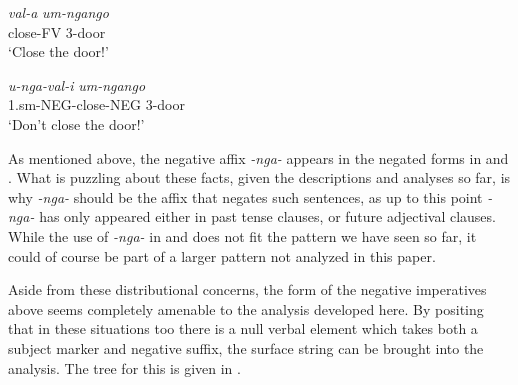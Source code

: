 \documentclass[output=paper]{langsci/langscibook}
\newcommand{\nga}[0]{\textit{-nga- }}
\begin{document}
\begin{exe}
\ex\label{ex:burkholder:28} \begin{xlist}
\ex\label{ex:burkholder:28a} \gll \textit{val-a} \textit{um-ngango}\\
        close-FV 3-door\\
    \glt `Close the door!'


\ex\label{ex:burkholder:28b} \gll \textit{u-nga-val-i} \textit{um-ngango}\\
        1.{\sc sm}-NEG-close-NEG 3-door\\
    \glt `Don't close the door!'
\end{xlist}
\end{exe}

As mentioned above, the negative affix \nga appears in the negated forms in  and . What is puzzling about these facts, given the descriptions and analyses so far, is why \nga should be the affix that negates such sentences, as up to this point \nga has only appeared either in past tense clauses, or future adjectival clauses. While the use of \nga in  and  does not fit the pattern we have seen so far, it could of course be part of a larger pattern not analyzed in this paper.

Aside from these distributional concerns, the form of the negative imperatives above seems completely amenable to the analysis developed here. By positing that in these situations too there is a null verbal element which takes both a subject marker and negative suffix, the surface string can be brought into the analysis. The tree for this is given in .
\end{document}

